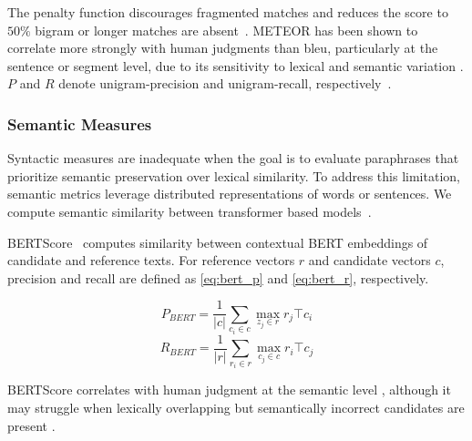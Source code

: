 The penalty function discourages fragmented matches and reduces the score to $50\%$ bigram or longer matches are absent~\citep{banerjee_METEOR_2005}. 
METEOR has been shown to correlate more strongly with human judgments than \ac{bleu}, particularly at the sentence or segment level, due to its sensitivity to lexical and semantic variation \citep{zhou_paraphrase_2021,kurt_pehlivanoglu_comparative_2024}.
$P$ and $R$ denote unigram-precision and unigram-recall, respectively~\citep{kurt_pehlivanoglu_comparative_2024,banerjee_METEOR_2005}.


\subsubsection{Semantic Measures}
Syntactic measures are inadequate when the goal is to evaluate paraphrases that prioritize semantic preservation over lexical similarity. 
To address this limitation, semantic metrics leverage distributed representations of words or sentences.
We compute semantic similarity between transformer based models~\citep{gohsen_captions_2023}.

BERTScore~\citep{hanna_fine_grained_2021} computes similarity between contextual BERT embeddings of candidate and reference texts. 
For reference vectors $r$ and candidate vectors $c$, precision and recall are defined as \autoref{eq:bert_p} and \autoref{eq:bert_r}, respectively.

\begin{equation}
    P_{BERT} = \frac{1}{|c|} \sum_{c_i \in c} \max_{z_j \in r} r_j\top c_i
\label{eq:bert_p}
\end{equation}
\begin{equation}
    R_{BERT} = \frac{1}{|r|} \sum_{r_i \in r} \max_{c_j \in c} r_i\top c_j
\label{eq:bert_r}
\end{equation}



BERTScore correlates with human judgment at the semantic level \citep{kurt_pehlivanoglu_comparative_2024}, although it may struggle when lexically overlapping but semantically incorrect candidates are present \citep{hanna_fine_grained_2021}.

